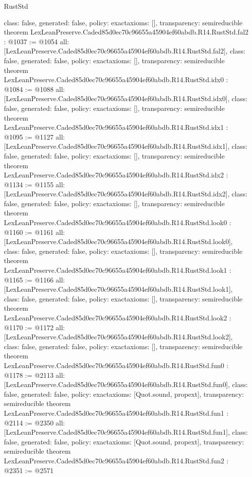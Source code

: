 \begin{lexlean}{RustStd}
\begin{coremodule}
{  class: false,
  generated: false,
  policy: exact{axioms: []},
  transparency: semireducible
}
theorem LexLeanPreserve.Caded85d0ec70c96655a45904ef60abdb.R14.RustStd.fal2 : @1037 := @1054 {
  all: [LexLeanPreserve.Caded85d0ec70c96655a45904ef60abdb.R14.RustStd.fal2],
  class: false,
  generated: false,
  policy: exact{axioms: []},
  transparency: semireducible
}
theorem LexLeanPreserve.Caded85d0ec70c96655a45904ef60abdb.R14.RustStd.idx0 : @1084 := @1088 {
  all: [LexLeanPreserve.Caded85d0ec70c96655a45904ef60abdb.R14.RustStd.idx0],
  class: false,
  generated: false,
  policy: exact{axioms: []},
  transparency: semireducible
}
theorem LexLeanPreserve.Caded85d0ec70c96655a45904ef60abdb.R14.RustStd.idx1 : @1095 := @1127 {
  all: [LexLeanPreserve.Caded85d0ec70c96655a45904ef60abdb.R14.RustStd.idx1],
  class: false,
  generated: false,
  policy: exact{axioms: []},
  transparency: semireducible
}
theorem LexLeanPreserve.Caded85d0ec70c96655a45904ef60abdb.R14.RustStd.idx2 : @1134 := @1155 {
  all: [LexLeanPreserve.Caded85d0ec70c96655a45904ef60abdb.R14.RustStd.idx2],
  class: false,
  generated: false,
  policy: exact{axioms: []},
  transparency: semireducible
}
theorem LexLeanPreserve.Caded85d0ec70c96655a45904ef60abdb.R14.RustStd.look0 : @1160 := @1161 {
  all: [LexLeanPreserve.Caded85d0ec70c96655a45904ef60abdb.R14.RustStd.look0],
  class: false,
  generated: false,
  policy: exact{axioms: []},
  transparency: semireducible
}
theorem LexLeanPreserve.Caded85d0ec70c96655a45904ef60abdb.R14.RustStd.look1 : @1165 := @1166 {
  all: [LexLeanPreserve.Caded85d0ec70c96655a45904ef60abdb.R14.RustStd.look1],
  class: false,
  generated: false,
  policy: exact{axioms: []},
  transparency: semireducible
}
theorem LexLeanPreserve.Caded85d0ec70c96655a45904ef60abdb.R14.RustStd.look2 : @1170 := @1172 {
  all: [LexLeanPreserve.Caded85d0ec70c96655a45904ef60abdb.R14.RustStd.look2],
  class: false,
  generated: false,
  policy: exact{axioms: []},
  transparency: semireducible
}
theorem LexLeanPreserve.Caded85d0ec70c96655a45904ef60abdb.R14.RustStd.fun0 : @1178 := @2113 {
  all: [LexLeanPreserve.Caded85d0ec70c96655a45904ef60abdb.R14.RustStd.fun0],
  class: false,
  generated: false,
  policy: exact{axioms: [Quot.sound, propext]},
  transparency: semireducible
}
theorem LexLeanPreserve.Caded85d0ec70c96655a45904ef60abdb.R14.RustStd.fun1 : @2114 := @2350 {
  all: [LexLeanPreserve.Caded85d0ec70c96655a45904ef60abdb.R14.RustStd.fun1],
  class: false,
  generated: false,
  policy: exact{axioms: [Quot.sound, propext]},
  transparency: semireducible
}
theorem LexLeanPreserve.Caded85d0ec70c96655a45904ef60abdb.R14.RustStd.fun2 : @2351 := @2571 {
}
\end{coremodule}
\end{lexlean}
